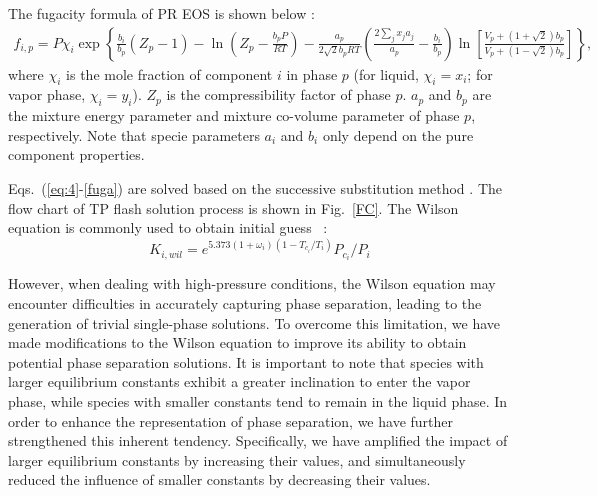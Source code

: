 


 
The fugacity formula of PR EOS is shown below \cite{yi2019multicomponent}:
\begin{align}
f_{i,p}=P \chi_i \exp \left\{\frac{b_i}{b_p}(Z_p - 1) - \ln(Z_p-\frac{b_p P}{RT}) - \frac{a_p} {2\sqrt{2} b_p R T} \left(\frac{2 \sum_j {x_j a_j} } {a_p} - \frac {b_i} {b_p}\right) \ln\left[\frac{V_p + \left(1+\sqrt{2}\right)b_p} {V_p + \left(1-\sqrt{2}\right) b_p}\right]\right\}, \label{fuga}
\end{align}
where $\chi_i$ is the mole fraction of component $i$ in phase $p$ (for liquid, $\chi_i=x_i$; for vapor phase, $\chi_i=y_i$). $Z_p$ is the compressibility factor of phase $p$. $a_p$ and $b_p$ are the mixture energy parameter and mixture co-volume parameter of phase $p$, respectively. Note that specie parameters $a_i$ and $b_i$ only depend on the pure component properties.

Eqs.~(\ref{eq:4}-\ref{fuga}) are solved based on the successive substitution method \cite{michelsen2007thermodynamic}. The flow chart of TP flash solution process is shown in Fig.~\ref{FC}.  The Wilson equation is commonly used to obtain initial guess ~\cite{wilson1964vapor}:
\begin{equation}
K_{i,wil}=e^{5.373(1+\omega_i)(1-T_{c_i}/T_i)}P_{c_i}/P_i
\end{equation}

However, when dealing with high-pressure conditions, the Wilson equation may encounter difficulties in accurately capturing phase separation, leading to the generation of trivial single-phase solutions. To overcome this limitation, we have made modifications to the Wilson equation to improve its ability to obtain potential phase separation solutions. It is important to note that species with larger equilibrium constants exhibit a greater inclination to enter the vapor phase, while species with smaller constants tend to remain in the liquid phase. In order to enhance the representation of phase separation, we have further strengthened this inherent tendency. Specifically, we have amplified the impact of larger equilibrium constants by increasing their values, and simultaneously reduced the influence of smaller constants by decreasing their values.

